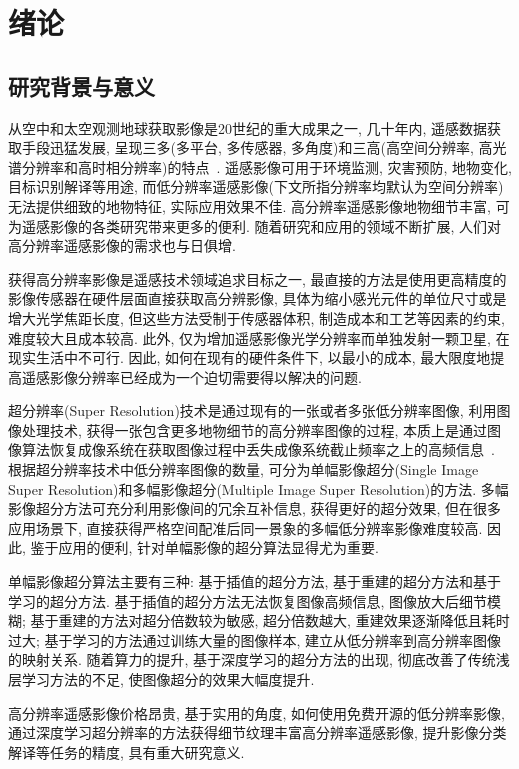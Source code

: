 \section{绪论}

\subsection{研究背景与意义}
从空中和太空观测地球获取影像是20世纪的重大成果之一, 几十年内, 遥感数据获取手段迅猛发展, 呈现三多(多平台, 多传感器, 多角度)和三高(高空间分辨率, 高光谱分辨率和高时相分辨率)的特点~\cite{lideren}. 遥感影像可用于环境监测, 灾害预防, 地物变化, 目标识别解译等用途, 而低分辨率遥感影像(下文所指分辨率均默认为空间分辨率)无法提供细致的地物特征, 实际应用效果不佳. 高分辨率遥感影像地物细节丰富, 可为遥感影像的各类研究带来更多的便利. 随着研究和应用的领域不断扩展, 人们对高分辨率遥感影像的需求也与日俱增. 

获得高分辨率影像是遥感技术领域追求目标之一, 最直接的方法是使用更高精度的影像传感器在硬件层面直接获取高分辨影像, 具体为缩小感光元件的单位尺寸或是增大光学焦距长度, 但这些方法受制于传感器体积, 制造成本和工艺等因素的约束, 难度较大且成本较高. 此外, 仅为增加遥感影像光学分辨率而单独发射一颗卫星, 在现实生活中不可行. 因此, 如何在现有的硬件条件下, 以最小的成本, 最大限度地提高遥感影像分辨率已经成为一个迫切需要得以解决的问题.

超分辨率(Super Resolution)技术是通过现有的一张或者多张低分辨率图像, 利用图像处理技术, 获得一张包含更多地物细节的高分辨率图像的过程, 本质上是通过图像算法恢复成像系统在获取图像过程中丢失成像系统截止频率之上的高频信息~\cite{yangxin}. 根据超分辨率技术中低分辨率图像的数量, 可分为单幅影像超分(Single Image Super Resolution)和多幅影像超分(Multiple Image Super Resolution)的方法. 多幅影像超分方法可充分利用影像间的冗余互补信息, 获得更好的超分效果, 但在很多应用场景下, 直接获得严格空间配准后同一景象的多幅低分辨率影像难度较高. 因此, 鉴于应用的便利, 针对单幅影像的超分算法显得尤为重要. 

单幅影像超分算法主要有三种: 基于插值的超分方法, 基于重建的超分方法和基于学习的超分方法. 基于插值的超分方法无法恢复图像高频信息, 图像放大后细节模糊; 基于重建的方法对超分倍数较为敏感, 超分倍数越大, 重建效果逐渐降低且耗时过大; 基于学习的方法通过训练大量的图像样本, 建立从低分辨率到高分辨率图像的映射关系. 随着算力的提升, 基于深度学习的超分方法的出现, 彻底改善了传统浅层学习方法的不足, 使图像超分的效果大幅度提升. 

高分辨率遥感影像价格昂贵, 基于实用的角度, 如何使用免费开源的低分辨率影像, 通过深度学习超分辨率的方法获得细节纹理丰富高分辨率遥感影像, 提升影像分类解译等任务的精度, 具有重大研究意义. 

